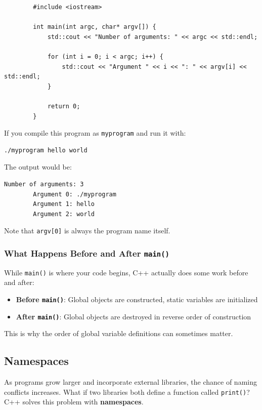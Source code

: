 \begin{example}{\leavevmode}
	
	\begin{lstlisting}
		#include <iostream>
		
		int main(int argc, char* argv[]) {
			std::cout << "Number of arguments: " << argc << std::endl;
			
			for (int i = 0; i < argc; i++) {
				std::cout << "Argument " << i << ": " << argv[i] << std::endl;
			}
			
			return 0;
		}
	\end{lstlisting}
	
	If you compile this program as \texttt{myprogram} and run it with:
	\begin{lstlisting}[language=bash,numbers=none]
		./myprogram hello world
	\end{lstlisting}
	
	The output would be:
	\begin{lstlisting}[numbers=none]
		Number of arguments: 3
		Argument 0: ./myprogram
		Argument 1: hello
		Argument 2: world
	\end{lstlisting}
	
	Note that \texttt{argv[0]} is always the program name itself.
\end{example}

\subsubsection{What Happens Before and After \texttt{main()}}

While \texttt{main()} is where your code begins, C++ actually does some work before and after:

\begin{itemize}
	\item \textbf{Before \texttt{main()}}: Global objects are constructed, static variables are initialized
	\item \textbf{After \texttt{main()}}: Global objects are destroyed in reverse order of construction
\end{itemize}

This is why the order of global variable definitions can sometimes matter.

\subsection{Namespaces}

As programs grow larger and incorporate external libraries, the chance of naming conflicts increases. What if two libraries both define a function called \texttt{print()}? C++ solves this problem with \textbf{namespaces}.

